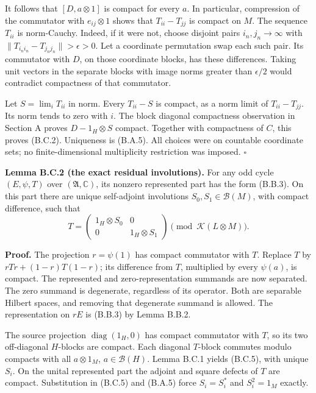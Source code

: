 \documentclass[
  11pt,
]{article}
\begin{document}
It follows that \([D,a\otimes1]\) is compact for every \(a\). In
particular, compression of the commutator with \(e_{ij}\otimes1\) shows
that \(T_{ii}-T_{jj}\) is compact on \(M\). The sequence \(T_{ii}\) is
norm-Cauchy. Indeed, if it were not, choose disjoint pairs
\(i_n,j_n\to\infty\) with \(\|T_{i_ni_n}-T_{j_nj_n}\|>\epsilon>0\). Let
a coordinate permutation swap each such pair. Its commutator with \(D\),
on those coordinate blocks, has these differences. Taking unit vectors
in the separate blocks with image norms greater than \(\epsilon/2\)
would contradict compactness of that commutator.

Let \(S=\lim_iT_{ii}\) in norm. Every \(T_{ii}-S\) is compact, as a norm
limit of \(T_{ii}-T_{jj}\). Its norm tends to zero with \(i\). The block
diagonal compactness observation in Section A proves \(D-1_H\otimes S\)
compact. Together with compactness of \(C\), this proves (B.C.2).
Uniqueness is (B.A.5). All choices were on countable coordinate sets; no
finite-dimensional multiplicity restriction was imposed. \(\square\)

\textbf{Lemma B.C.2 (the exact residual involutions).} For any odd cycle
\((E,\psi,T)\) over \((\mathfrak A,\mathbb C)\), its nonzero represented
part has the form (B.B.3). On this part there are unique self-adjoint
involutions \(S_0,S_1\in\mathcal B(M)\), with compact difference, such
that \[
T=\begin{pmatrix}1_H\otimes S_0&0\\0&1_H\otimes S_1\end{pmatrix}
\pmod{\mathcal K(L\otimes M)}.
\tag{B.C.5}
\]

\textbf{Proof.} The projection \(r=\psi(1)\) has compact commutator with
\(T\). Replace \(T\) by \(rTr+(1-r)T(1-r)\); its difference from \(T\),
multiplied by every \(\psi(a)\), is compact. The represented and
zero-representation summands are now separated. The zero summand is
degenerate, regardless of its operator. Both are separable Hilbert
spaces, and removing that degenerate summand is allowed. The
representation on \(rE\) is (B.B.3) by Lemma B.B.2.

The source projection \(\operatorname{diag}(1_H,0)\) has compact
commutator with \(T\), so its two off-diagonal \(H\)-blocks are compact.
Each diagonal \(T\)-block commutes modulo compacts with all
\(a\otimes1_M\), \(a\in\mathcal B(H)\). Lemma B.C.1 yields (B.C.5), with
unique \(S_i\). On the unital represented part the adjoint and square
defects of \(T\) are compact. Substitution in (B.C.5) and (B.A.5) force
\(S_i=S_i^*\) and \(S_i^2=1_M\) exactly.
\end{document}
